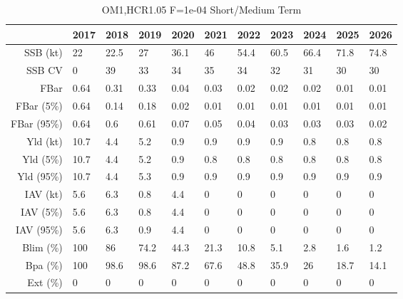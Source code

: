 \begin{table}[ht]
\centering
\begin{tabular}{rllllllllll}
  \hline
 & 2017 & 2018 & 2019 & 2020 & 2021 & 2022 & 2023 & 2024 & 2025 & 2026 \\ 
  \hline
SSB (kt) & 22 & 22.5 & 27 & 36.1 & 46 & 54.4 & 60.5 & 66.4 & 71.8 & 74.8 \\ 
  SSB CV & 0 & 39 & 33 & 34 & 35 & 34 & 32 & 31 & 30 & 30 \\ 
   \hline
FBar & 0.64 & 0.31 & 0.33 & 0.04 & 0.03 & 0.02 & 0.02 & 0.02 & 0.01 & 0.01 \\ 
  FBar (5\%) & 0.64 & 0.14 & 0.18 & 0.02 & 0.01 & 0.01 & 0.01 & 0.01 & 0.01 & 0.01 \\ 
  FBar (95\%) & 0.64 & 0.6 & 0.61 & 0.07 & 0.05 & 0.04 & 0.03 & 0.03 & 0.03 & 0.02 \\ 
   \hline
Yld (kt) & 10.7 & 4.4 & 5.2 & 0.9 & 0.9 & 0.9 & 0.9 & 0.8 & 0.8 & 0.8 \\ 
  Yld (5\%) & 10.7 & 4.4 & 5.2 & 0.9 & 0.8 & 0.8 & 0.8 & 0.8 & 0.8 & 0.8 \\ 
  Yld (95\%) & 10.7 & 4.4 & 5.3 & 0.9 & 0.9 & 0.9 & 0.9 & 0.9 & 0.9 & 0.9 \\ 
   \hline
IAV (kt) & 5.6 & 6.3 & 0.8 & 4.4 & 0 & 0 & 0 & 0 & 0 & 0 \\ 
  IAV (5\%) & 5.6 & 6.3 & 0.8 & 4.4 & 0 & 0 & 0 & 0 & 0 & 0 \\ 
  IAV (95\%) & 5.6 & 6.3 & 0.9 & 4.4 & 0 & 0 & 0 & 0 & 0 & 0 \\ 
   \hline
Blim (\%) & \cellcolor{red}100 & \cellcolor{red}86 & \cellcolor{red}74.2 & \cellcolor{red}44.3 & \cellcolor{red}21.3 & \cellcolor{red}10.8 & \cellcolor{red}5.1 & \cellcolor{green}2.8 & \cellcolor{green}1.6 & \cellcolor{green}1.2 \\ 
  Bpa (\%) & 100 & 98.6 & 98.6 & 87.2 & 67.6 & 48.8 & 35.9 & 26 & 18.7 & 14.1 \\ 
  Ext (\%) & 0 & 0 & 0 & 0 & 0 & 0 & 0 & 0 & 0 & 0 \\ 
   \hline
\end{tabular}
\caption{OM1,HCR1.05 F=1e-04 Short/Medium Term} 
\end{table}


